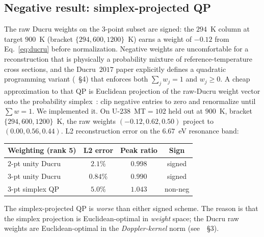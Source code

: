 \subsection{Negative result: simplex-projected QP}
\label{sec:off_library_qp}

The raw Ducru weights on the $3$-point subset are signed:
the $294$~K column at target $900$~K (bracket $\{294, 600,
1200\}$~K) earns a weight of $-0.12$ from Eq.~\ref{eq:ducru}
before normalization. Negative weights are uncomfortable
for a reconstruction that is physically a probability
mixture of reference-temperature cross sections, and the
Ducru~$2017$ paper explicitly defines a quadratic
programming variant (\cite{ducru2017}~§4) that enforces
both $\sum_j w_j = 1$ and $w_j \geq 0$. A cheap
approximation to that QP is Euclidean projection of the
raw-Ducru weight vector onto the probability
simplex~\cite{duchi2008simplex}: clip negative entries to
zero and renormalize until $\sum w = 1$. We implemented
it. On U-$238$~MT$=102$ held out at $900$~K,
bracket $\{294, 600, 1200\}$~K, the raw weights
$(-0.12, 0.62, 0.50)$ project to $(0.00, 0.56, 0.44)$.
L2 reconstruction error on the $6.67$~eV resonance band:

\begin{center}
\begin{tabular}{@{}lccc@{}}
\toprule
Weighting (rank 5) & L2 error & Peak ratio & Sign \\
\midrule
$2$-pt unity Ducru & $2.1\%$  & $0.998$ & signed \\
$3$-pt unity Ducru & $0.84\%$ & $0.990$ & signed \\
$3$-pt simplex QP  & $5.0\%$  & $1.043$ & non-neg \\
\bottomrule
\end{tabular}
\end{center}

The simplex-projected QP is \emph{worse} than either signed
scheme. The reason is that the simplex projection is
Euclidean-optimal in \emph{weight} space; the Ducru raw
weights are Euclidean-optimal in the \emph{Doppler-kernel}
norm (see~\cite{ducru2017}~§3).

